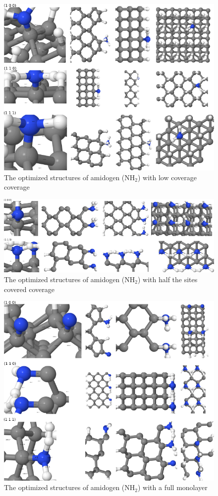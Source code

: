\documentclass[10pt,a4paper]{article}
\begin{document}
\begin{figure} \captionsetup{width=.8\linewidth} \caption{The optimized structures of amidogen (NH$_2$) with low coverage coverage} \label{NH2_summary_low}
\includegraphics[width=.8\linewidth]{pictures/NH2_summary_low.png}
\end{figure}

\begin{figure} \captionsetup{width=.8\linewidth} \caption{The optimized structures of amidogen (NH$_2$) with half the sites covered coverage} \label{NH2_summary_covered}
\includegraphics[width=.8\linewidth]{pictures/NH2_summary_covered.png}
\end{figure}

\begin{figure} \captionsetup{width=.8\linewidth} \caption{The optimized structures of amidogen (NH$_2$) with a full monolayer} \label{NH2_summary_half}
\includegraphics[width=.8\linewidth]{pictures/NH2_summary_half.png}
\end{figure}
\end{document}
